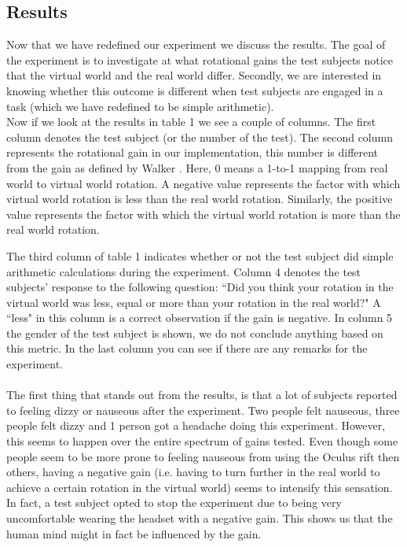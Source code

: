 \subsection{Results}
Now that we have redefined our experiment we discuss the results.
The goal of the experiment is to investigate at what rotational gains the test subjects notice that the virtual world and the real world differ.
Secondly, we are interested in knowing whether this outcome is different when test subjects are engaged in a task (which we have redefined to be simple arithmetic).\\

Now if we look at the results in table 1 we see a couple of columns.
The first column denotes the test subject (or the number of the test).
The second column represents the rotational gain in our implementation, this number is different from the gain as defined by Walker \cite{jwalker}.
Here, 0 means a 1-to-1 mapping from real world to virtual world rotation.
A negative value represents the factor with which virtual world rotation is less than the real world rotation.
Similarly, the positive value represents the factor with which the virtual world rotation is more than the real world rotation.

The third column of table 1 indicates whether or not the test subject did simple arithmetic calculations during the experiment.
Column 4 denotes the test subjects'  response to the following question: ``Did you think your rotation in the virtual world was less, equal or more than your rotation in the real world?"
A ``less" in this column is a correct observation if the gain is negative.
In column 5 the gender of the test subject is shown, we do not conclude anything based on this metric.
In the last column you can see if there are any remarks for the experiment.\\
\\
The first thing that stands out from the results, is that a lot of subjects reported to feeling dizzy or nauseous after the experiment.
Two people felt nauseous, three people felt dizzy and 1 person got a headache doing this experiment.
However, this seems to happen over the entire spectrum of gains tested.
Even though some people seem to be more prone to feeling nauseous from using the Oculus rift then others, having a negative gain (i.e. having to turn further in the real world to achieve a certain rotation in the virtual world) seems to intensify this sensation.
In fact, a test subject opted to stop the experiment due to being very uncomfortable wearing the headset with a negative gain.
This shows us that the human mind might in fact be influenced by the gain.


